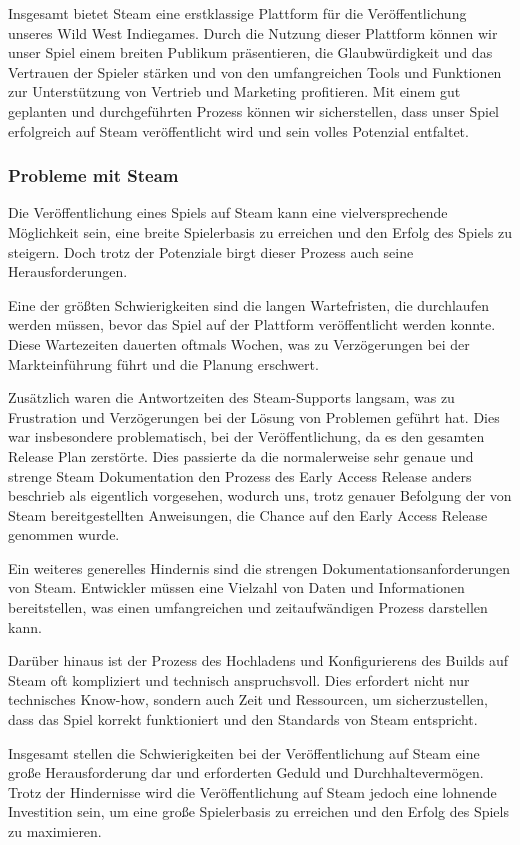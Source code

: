 Insgesamt bietet Steam eine erstklassige Plattform für die Veröffentlichung unseres Wild West Indiegames.
Durch die Nutzung dieser Plattform können wir unser Spiel einem breiten Publikum präsentieren, die Glaubwürdigkeit und das Vertrauen der Spieler stärken und von den
umfangreichen Tools und Funktionen zur Unterstützung von Vertrieb und Marketing profitieren.
Mit einem gut geplanten und durchgeführten Prozess können wir sicherstellen, dass unser Spiel erfolgreich auf Steam veröffentlicht wird und sein volles Potenzial entfaltet.

 \subsubsection{Probleme mit Steam}\label{subsubsec:Steam-Herausforderungen}
Die Veröffentlichung eines Spiels auf Steam kann eine vielversprechende Möglichkeit sein, eine breite Spielerbasis zu erreichen und den Erfolg des Spiels zu steigern. Doch trotz der Potenziale birgt dieser Prozess auch seine Herausforderungen.

Eine der größten Schwierigkeiten sind die langen Wartefristen, die durchlaufen werden müssen, bevor das Spiel auf der Plattform veröffentlicht werden konnte. Diese Wartezeiten dauerten oftmals Wochen, was zu Verzögerungen bei der Markteinführung führt und die Planung erschwert.

Zusätzlich waren die Antwortzeiten des Steam-Supports langsam, was zu Frustration und Verzögerungen bei der Lösung von Problemen geführt hat. Dies war insbesondere problematisch, bei der Veröffentlichung, da es den gesamten Release Plan zerstörte.
Dies passierte da die normalerweise sehr genaue und strenge Steam Dokumentation den Prozess des Early Access Release anders beschrieb als eigentlich vorgesehen, wodurch uns, trotz genauer Befolgung der von Steam bereitgestellten Anweisungen, die Chance auf den Early Access Release genommen wurde.

Ein weiteres generelles Hindernis sind die strengen Dokumentationsanforderungen von Steam. Entwickler müssen eine Vielzahl von Daten und Informationen bereitstellen, was einen umfangreichen und zeitaufwändigen Prozess darstellen kann.

Darüber hinaus ist der Prozess des Hochladens und Konfigurierens des Builds auf Steam oft kompliziert und technisch anspruchsvoll. Dies erfordert nicht nur technisches Know-how, sondern auch Zeit und Ressourcen, um sicherzustellen, dass das Spiel korrekt funktioniert und den Standards von Steam entspricht.

Insgesamt stellen die Schwierigkeiten bei der Veröffentlichung auf Steam eine große Herausforderung dar und erforderten Geduld und Durchhaltevermögen.
Trotz der Hindernisse wird die Veröffentlichung auf Steam jedoch eine lohnende Investition sein, um eine große Spielerbasis zu erreichen und den Erfolg des Spiels zu maximieren.



%

\renewcommand{\kapitelautor}{}